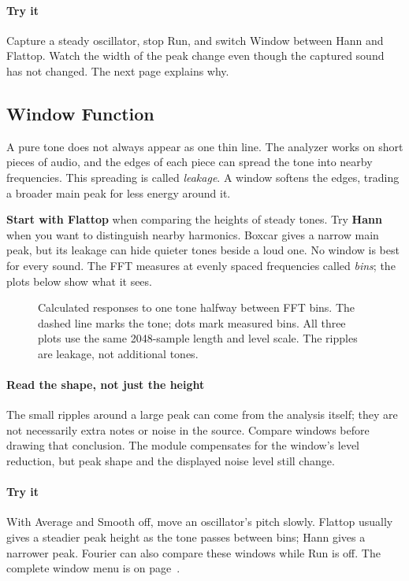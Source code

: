 \paragraph{Try it}
Capture a steady oscillator, stop Run, and switch Window between Hann and
Flattop. Watch the width of the peak change even though the captured sound
has not changed. The next page explains why.

\clearpage
\subsection{Window Function}
A pure tone does not always appear as one thin line. The analyzer works on
short pieces of audio, and the edges of each piece can spread the tone into
nearby frequencies. This spreading is called \textit{leakage}. A window
softens the edges, trading a broader main peak for less energy around it.

\textbf{Start with Flattop} when comparing the heights of steady tones.
Try \textbf{Hann} when you want to distinguish nearby harmonics. Boxcar gives
a narrow main peak, but its leakage can hide quieter tones beside a loud one.
No window is best for every sound. The FFT measures at evenly spaced
frequencies called \textit{bins}; the plots below show what it sees.

\begin{figure}[!htp]
\centering

\caption{Calculated responses to one tone halfway between FFT bins.
The dashed line marks the tone; dots mark measured bins. All three plots use
the same 2048-sample length and level scale. The ripples are leakage, not
additional tones.}
\end{figure}

\paragraph{Read the shape, not just the height}
The small ripples around a large peak can come from the analysis itself;
they are not necessarily extra notes or noise in the source. Compare windows
before drawing that conclusion. The module compensates for the window's
level reduction, but peak shape and the displayed noise level still change.

\paragraph{Try it}
With Average and Smooth off, move an oscillator's pitch slowly. Flattop
usually gives a steadier peak height as the tone passes between bins;
Hann gives a narrower peak. Fourier can also compare these windows while
Run is off. The complete window menu is on page~\pageref{sec:control-values}.

